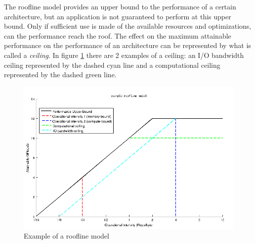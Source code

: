 The roofline model provides an upper bound to the performance of a certain architecture, but an application is not guaranteed to perform at this upper bound. Only if sufficient use is made of the available resources and optimizations, can the performance reach the roof. The effect on the maximum attainable performance on the performance of an architecture can be represented by what is called a \emph{ceiling}. In figure \ref{img:roofline_example} there are 2 examples of a ceiling: an I/O bandwidth ceiling represented by the dashed cyan line and a computational ceiling represented by the dashed green line. 

\begin{figure}[H]
\centering
\includegraphics[scale=0.6]{./images/matlab_plots/roofline_example.png}
\caption{Example of a roofline model}
\label{img:roofline_example}
\end{figure}

